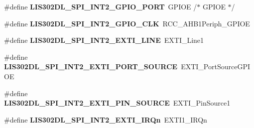 \begin{DoxyCompactItemize}
\item 
\hypertarget{group___s_t_m32_f4___d_i_s_c_o_v_e_r_y___l_i_s302_d_l___exported___constants_ga4a38990bbe7b3b24552496c21f57eee6}{\#define {\bfseries L\-I\-S302\-D\-L\-\_\-\-S\-P\-I\-\_\-\-I\-N\-T2\-\_\-\-G\-P\-I\-O\-\_\-\-P\-O\-R\-T}~G\-P\-I\-O\-E                       /$\ast$ G\-P\-I\-O\-E $\ast$/}\label{group___s_t_m32_f4___d_i_s_c_o_v_e_r_y___l_i_s302_d_l___exported___constants_ga4a38990bbe7b3b24552496c21f57eee6}

\item 
\hypertarget{group___s_t_m32_f4___d_i_s_c_o_v_e_r_y___l_i_s302_d_l___exported___constants_ga2521d9258c79091797641da68b4a8b76}{\#define {\bfseries L\-I\-S302\-D\-L\-\_\-\-S\-P\-I\-\_\-\-I\-N\-T2\-\_\-\-G\-P\-I\-O\-\_\-\-C\-L\-K}~R\-C\-C\-\_\-\-A\-H\-B1\-Periph\-\_\-\-G\-P\-I\-O\-E}\label{group___s_t_m32_f4___d_i_s_c_o_v_e_r_y___l_i_s302_d_l___exported___constants_ga2521d9258c79091797641da68b4a8b76}

\item 
\hypertarget{group___s_t_m32_f4___d_i_s_c_o_v_e_r_y___l_i_s302_d_l___exported___constants_ga8129f1d61266fb2332e3345bf14b520d}{\#define {\bfseries L\-I\-S302\-D\-L\-\_\-\-S\-P\-I\-\_\-\-I\-N\-T2\-\_\-\-E\-X\-T\-I\-\_\-\-L\-I\-N\-E}~E\-X\-T\-I\-\_\-\-Line1}\label{group___s_t_m32_f4___d_i_s_c_o_v_e_r_y___l_i_s302_d_l___exported___constants_ga8129f1d61266fb2332e3345bf14b520d}

\item 
\hypertarget{group___s_t_m32_f4___d_i_s_c_o_v_e_r_y___l_i_s302_d_l___exported___constants_ga8a94904ce1cbae723690784bf660dc28}{\#define {\bfseries L\-I\-S302\-D\-L\-\_\-\-S\-P\-I\-\_\-\-I\-N\-T2\-\_\-\-E\-X\-T\-I\-\_\-\-P\-O\-R\-T\-\_\-\-S\-O\-U\-R\-C\-E}~E\-X\-T\-I\-\_\-\-Port\-Source\-G\-P\-I\-O\-E}\label{group___s_t_m32_f4___d_i_s_c_o_v_e_r_y___l_i_s302_d_l___exported___constants_ga8a94904ce1cbae723690784bf660dc28}

\item 
\hypertarget{group___s_t_m32_f4___d_i_s_c_o_v_e_r_y___l_i_s302_d_l___exported___constants_gae9f2d14d2bd007971095ccc6d5d43ac8}{\#define {\bfseries L\-I\-S302\-D\-L\-\_\-\-S\-P\-I\-\_\-\-I\-N\-T2\-\_\-\-E\-X\-T\-I\-\_\-\-P\-I\-N\-\_\-\-S\-O\-U\-R\-C\-E}~E\-X\-T\-I\-\_\-\-Pin\-Source1}\label{group___s_t_m32_f4___d_i_s_c_o_v_e_r_y___l_i_s302_d_l___exported___constants_gae9f2d14d2bd007971095ccc6d5d43ac8}

\item 
\hypertarget{group___s_t_m32_f4___d_i_s_c_o_v_e_r_y___l_i_s302_d_l___exported___constants_ga11e6f6cd2fb081f2b21ddae3cbd55d7a}{\#define {\bfseries L\-I\-S302\-D\-L\-\_\-\-S\-P\-I\-\_\-\-I\-N\-T2\-\_\-\-E\-X\-T\-I\-\_\-\-I\-R\-Qn}~E\-X\-T\-I1\-\_\-\-I\-R\-Qn}\label{group___s_t_m32_f4___d_i_s_c_o_v_e_r_y___l_i_s302_d_l___exported___constants_ga11e6f6cd2fb081f2b21ddae3cbd55d7a}


\end{DoxyCompactItemize}
